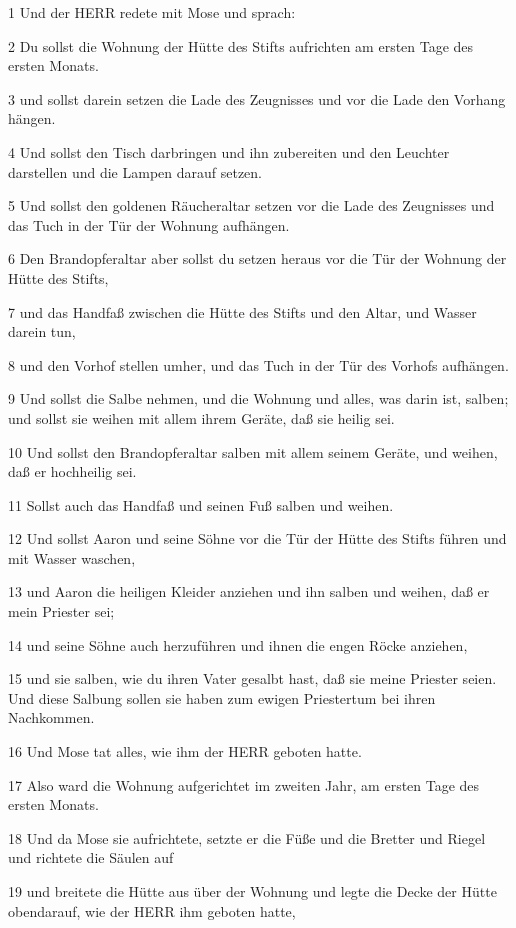 \par 1 Und der HERR redete mit Mose und sprach:
\par 2 Du sollst die Wohnung der Hütte des Stifts aufrichten am ersten Tage des ersten Monats.
\par 3 und sollst darein setzen die Lade des Zeugnisses und vor die Lade den Vorhang hängen.
\par 4 Und sollst den Tisch darbringen und ihn zubereiten und den Leuchter darstellen und die Lampen darauf setzen.
\par 5 Und sollst den goldenen Räucheraltar setzen vor die Lade des Zeugnisses und das Tuch in der Tür der Wohnung aufhängen.
\par 6 Den Brandopferaltar aber sollst du setzen heraus vor die Tür der Wohnung der Hütte des Stifts,
\par 7 und das Handfaß zwischen die Hütte des Stifts und den Altar, und Wasser darein tun,
\par 8 und den Vorhof stellen umher, und das Tuch in der Tür des Vorhofs aufhängen.
\par 9 Und sollst die Salbe nehmen, und die Wohnung und alles, was darin ist, salben; und sollst sie weihen mit allem ihrem Geräte, daß sie heilig sei.
\par 10 Und sollst den Brandopferaltar salben mit allem seinem Geräte, und weihen, daß er hochheilig sei.
\par 11 Sollst auch das Handfaß und seinen Fuß salben und weihen.
\par 12 Und sollst Aaron und seine Söhne vor die Tür der Hütte des Stifts führen und mit Wasser waschen,
\par 13 und Aaron die heiligen Kleider anziehen und ihn salben und weihen, daß er mein Priester sei;
\par 14 und seine Söhne auch herzuführen und ihnen die engen Röcke anziehen,
\par 15 und sie salben, wie du ihren Vater gesalbt hast, daß sie meine Priester seien. Und diese Salbung sollen sie haben zum ewigen Priestertum bei ihren Nachkommen.
\par 16 Und Mose tat alles, wie ihm der HERR geboten hatte.
\par 17 Also ward die Wohnung aufgerichtet im zweiten Jahr, am ersten Tage des ersten Monats.
\par 18 Und da Mose sie aufrichtete, setzte er die Füße und die Bretter und Riegel und richtete die Säulen auf
\par 19 und breitete die Hütte aus über der Wohnung und legte die Decke der Hütte obendarauf, wie der HERR ihm geboten hatte,
